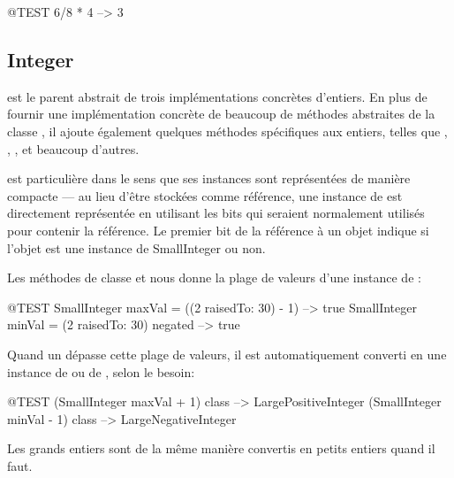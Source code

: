 \documentclass[a4paper,10pt,twoside]{book}
\begin{document}
\begin{code}{@TEST}
6/8 * 4 --> 3
\end{code}


\subsection{Integer}

 est le parent abstrait de trois implémentations concrètes d'entiers. En plus de fournir une implémentation concrète de beaucoup de méthodes abstraites de la classe , il ajoute également quelques méthodes spécifiques aux entiers, telles que , , ,  et beaucoup d'autres.

 est particulière dans le sens que ses instances sont représentées de manière compacte --- au lieu d'être stockées comme référence, une instance de  est directement représentée en utilisant les bits qui seraient normalement utilisés pour contenir la référence.  Le premier bit de la référence à un objet indique si l'objet est une instance de SmallInteger ou non.

Les méthodes de classe  et  nous donne la plage de valeurs d'une instance de :

\begin{code}{@TEST}
SmallInteger maxVal = ((2 raisedTo: 30) - 1)      --> true
SmallInteger minVal = (2 raisedTo: 30) negated --> true
\end{code}

Quand un  dépasse cette plage de valeurs, il est automatiquement converti en une instance de  ou de , selon le besoin:

\begin{code}{@TEST}
(SmallInteger maxVal + 1) class --> LargePositiveInteger
(SmallInteger minVal - 1) class  --> LargeNegativeInteger
\end{code}

Les grands entiers sont de la même manière convertis en petits entiers quand il faut.
\end{document}
